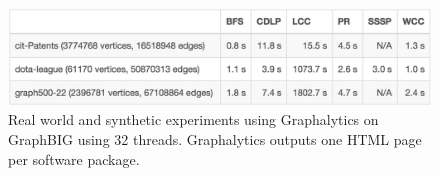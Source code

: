 \documentclass[conference]{IEEEtran}
\begin{document}
\begin{figure}
	\includegraphics[width=\linewidth, trim=0 18pt 6pt 0pt, clip]{graphics/graphalytics-GraphBIG.png}
	\caption{Real world and synthetic experiments using Graphalytics on GraphBIG using 32 threads. Graphalytics outputs one HTML page per software package.}
	\label{fig:graphalytics-html}
\end{figure}
\end{document}

